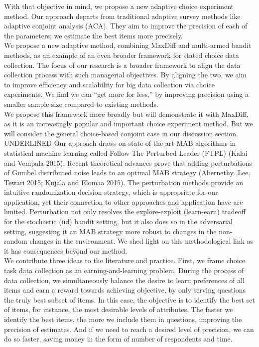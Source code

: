\documentclass[mksc,blindrev]{informs3} %
\begin{document}
With that objective in mind, we propose a new adaptive choice experiment method. 
Our approach departs from traditional adaptive survey methods like adaptive conjoint analysis (ACA). They aim to improve the precision of each of the parameters; we estimate the best items more precisely. \\
We propose a new adaptive method, combining MaxDiff and multi-armed bandit methods, as an example of an even broader framework for stated choice data collection. The focus of our research is a broader framework to align the data collection process with such managerial objectives. By aligning the two, we aim to improve efficiency and scalability for big data collection via choice experiments. We find we can “get more for less,” by improving precision using a smaller sample size compared to existing methods.\\
We propose this framework more broadly but will demonstrate it with MaxDiff, as it is an increasingly popular and important choice experiment method. But we will consider the general choice-based conjoint case in our discussion section. \\
UNDERLINED Our approach draws on state-of-the-art MAB algorithms in statistical machine learning called Follow The Perturbed Leader (FTPL) (Kalai and Vempala 2015). Recent theoretical advances prove that adding perturbations of Gumbel distributed noise leads to an optimal MAB strategy (Abernethy ,Lee, Tewari 2015; Kujala and Elomaa 2015). The perturbation methods provide an intuitive randomization decision strategy, which is appropriate for our application, yet their connection to other approaches and application have are limited. Perturbation not only resolves the explore-exploit (learn-earn) tradeoff for the stochastic (iid) bandit setting, but it also does so in the adversarial setting, suggesting it an MAB strategy more robust to changes in the non-random changes in the environment. We shed light on this methodological link as it has consequences beyond our method.\\
We contribute three ideas to the literature and practice. First, we frame choice task data collection as an earning-and-learning problem. During the process of data collection, we simultaneously balance the desire to learn preferences of all items and earn a reward towards achieving objective, by only serving questions the truly best subset of items. In this case, the objective is to identify the best set of items, for instance, the most desirable levels of attributes. The faster we identify the best items, the more we include them in questions, improving the precision of estimates. And if we need to reach a desired level of precision, we can do so faster, saving money in the form of number of respondents and time. 
\end{document}
